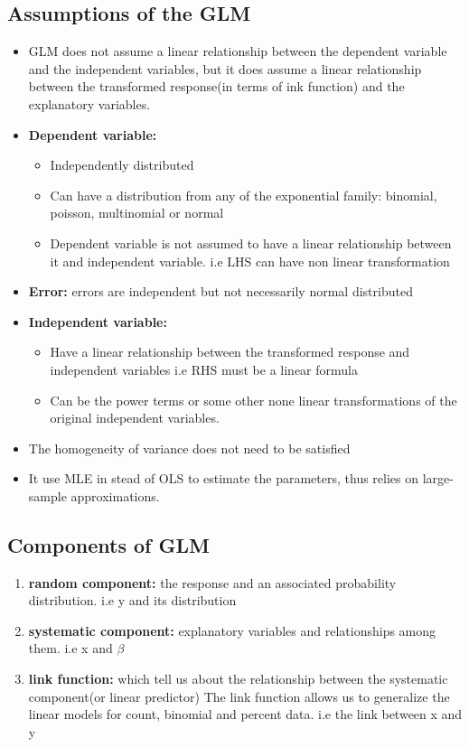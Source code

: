 \documentclass{article}
\theoremstyle{definition}
\theoremstyle{thrm}
\theoremstyle{lma}
\theoremstyle{ppst}
\theoremstyle{crlr}
\begin{document}
\subsection{Assumptions of the GLM}
\begin{itemize}
	\item GLM does not assume a linear relationship between the dependent variable and the independent variables, but it does assume a linear relationship between the transformed response(in terms of ink function) and the explanatory variables. 
	\item \textbf{Dependent variable:}
	\begin{itemize}
		\item Independently distributed
		\item Can have a distribution from any of the exponential family: binomial, poisson, multinomial or normal
		\item Dependent variable is not assumed to have a linear relationship between it and independent variable. i.e LHS can have non linear transformation
	\end{itemize}
	\item \textbf{Error: }errors are independent but not necessarily normal distributed 
	\item \textbf{Independent variable: }
	\begin{itemize}
		\item Have a linear relationship between the transformed response and independent variables i.e RHS must be a linear formula
		\item Can be the power terms or some other none linear transformations of the original independent variables.
	\end{itemize}
	\item The homogeneity of variance does not need to be satisfied
	\item It use MLE in stead of OLS to estimate the parameters, thus relies on large-sample approximations.
\end{itemize}
\subsection{Components of GLM}
\begin{enumerate}
	\item \textbf{random component: }the response and an associated probability distribution. i.e y and its distribution
	\item \textbf{systematic component: }explanatory variables and relationships among them. i.e x and $\beta$
	\item \textbf{link function: }which tell us about the relationship between the systematic component(or linear predictor) The link function allows us to generalize the linear models for count, binomial and percent data. i.e the link between x and y 
\end{enumerate}
\end{document}
